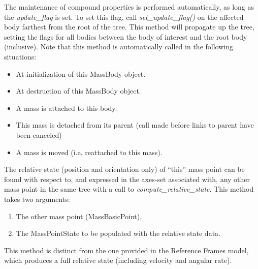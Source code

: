 The maintenance of compound properties is performed automatically, as long as
the \textit{update\_flag} is set.  To set this flag, call
\textit{set\_update\_flag()} on the affected body farthest from the root of
the
tree.  This method will propagate up the tree, setting the flags for all
bodies between the body of interest and the root body (inclusive).
Note that this method is automatically called in the following situations:
\begin{itemize}
 \item At initialization of this MassBody object.
 \item At destruction of this MassBody object.
 \item A mass is attached to this body.
 \item This mass is detached from its parent (call made before links to parent
 have been canceled)
 \item A mass is moved (i.e. reattached to this mass).
\end{itemize}

The relative state (position and orientation only) of ``this'' mass point can
be found with respect to, and expressed in the axes-set associated with, any
other mass point in the same tree with a call to
\textit{compute\_relative\_state}.  This method takes two arguments:
\begin{enumerate}
 \item The other mass point (MassBasicPoint),
 \item The MassPointState to be populated with the relative state data.
\end{enumerate}

This method is distinct from the one provided in the Reference Frames model,
which produces a full relative state (including velocity and angular rate).

